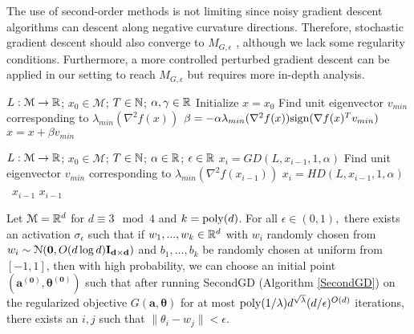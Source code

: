 The use of second-order methods is not limiting since noisy gradient descent algorithms can descent along negative curvature directions. Therefore, stochastic gradient descent should also converge to $M_{G,\epsilon}$ \cite{GeHJY15}, although we lack some regularity conditions. Furthermore, a more controlled perturbed gradient descent \cite{jin2017escape} can be applied in our setting to reach $M_{G,\epsilon}$ but requires more in-depth analysis.

%
\begin{algorithm}[hb]
 \caption{$x = HD(L,x_0, T,\alpha$)}
   \label{HD}
\begin{algorithmic}
    $L: \mathcal{M} \to {\mathbb{R}}$; $x_0 \in \mathcal{M}$; $T\in {\mathbb{N}}$; $\alpha, \gamma \in {\mathbb{R}}$
   \State Initialize $x = x_0$
   \State Find unit eigenvector $v_{min}$ corresponding to $\lambda_{min}(\nabla^2 f(x))$ 
   \State  $\beta = -\alpha \lambda_{min}(\nabla^2 f(x)) \text{sign}(\nabla f(x)^Tv_{min}) $
    \State $x = x + \beta v_{min}$
   \EndFor
\end{algorithmic}
\end{algorithm}
%
\begin{algorithm}[hb]
 \caption{$x = SecondGD(L, x_0, T,\alpha, \eta, \gamma)$}
   \label{SecondGD}
\begin{algorithmic}
    $L:\mathcal{M} \to {\mathbb{R}}$; $x_0 \in \mathcal{M}$; $T\in {\mathbb{N}}$; $\alpha \in {\mathbb{R}}$; $\epsilon\in{\mathbb{R}}$
   \State  $x_{i} = GD(L, x_{i-1}, 1, \alpha)$
   \Else 
   \State Find unit eigenvector $v_{min}$ corresponding to $\lambda_{min}(\nabla^2 f(x_{i-1}))$ 
    \State $x_i = HD(L, x_{i-1}, 1, \alpha)$ 
    \Else \ \Return $x_{i-1}$
    \EndIf
   \EndIf
     \Return $x_{i-1}$
   \EndIf {}
   \EndFor
   \end{algorithmic}
\end{algorithm}
%
\begin{theorem}\label{almostHarmSGD}
  Let $\mathcal{M} = {\mathbb{R}}^{d}$ for $d \equiv 3 \mod 4$ and $k = \mathrm{poly}(d)$. For all $\epsilon \in (0,1),$ there exists an activation $\sigma_\epsilon$ such that if $w_1,...,w_k \in {\mathbb{R}}^d$ with $w_i$ randomly chosen from $w_i \sim  \mathcal{N}({\bf 0}, O(d\log d){\bf I_{d\times d}})$ and $b_1,...,b_k$ be randomly chosen at uniform from $[-1,1]$, then with high probability, we can choose an initial point $(\boldsymbol{a^{(0)}, \theta^{(0)}})$ such that after running SecondGD (Algorithm \ref{SecondGD}) on the regularized objective $G(\boldsymbol{a,\theta})$ for at most $\mathrm{poly}(1/\lambda)d^{\sqrt{\lambda}}(d/\epsilon)^{O(d)}$ iterations, there exists an $i, j$ such that $\|\theta_i - w_j\| <  \epsilon$.
\end{theorem}
